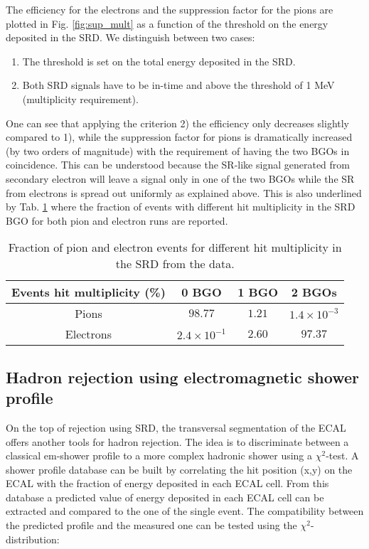 The efficiency for the electrons and the suppression factor for the pions are plotted in Fig. \ref{fig:sup_mult} as a function of the threshold on the energy deposited in the SRD. We distinguish between two cases:
\begin{enumerate}
\item The threshold is set on the total energy deposited in the SRD.
\item Both SRD signals have to be in-time and above the threshold of 1 MeV (multiplicity requirement).
\end{enumerate}
One can see that applying the criterion 2) the efficiency only decreases slightly compared to 1), while the suppression factor for pions is dramatically increased (by two orders of magnitude) with the requirement of having the two BGOs in coincidence.
This can be understood because the SR-like signal generated from secondary electron will leave a signal only in one of the two BGOs while the SR from electrons is spread out uniformly as explained above. 
This is also underlined by Tab. \ref{tab:hits} where the fraction of events with different hit multiplicity in the SRD BGO for both pion and electron runs are reported.

\begin{table}[hbt!]
\begin{center}
\begin{tabular}{cccc}
Events hit multiplicity  (\%) & 0 BGO  & 1 BGO & 2 BGOs\\
\hline
Pions & $98.77$ & $1.21$ & $1.4\times10^{-3}$  \\
Electrons & $2.4\times10^{-1}$  & $2.60$ & $97.37$ \\
\end{tabular}
\end{center}
\caption[Fraction of pion and electron events for different hit multiplicity in the SRD from the data]{Fraction of pion and electron events for different hit multiplicity in the SRD from the data.}
\label{tab:hits}

\end{table}

\subsection{Hadron rejection using electromagnetic shower profile}
\label{ch3:sec:bkg-ecal-profile}

On the top of rejection using SRD, the transversal segmentation of the ECAL offers another tools for hadron rejection. The idea is to discriminate between a classical em-shower profile to a more complex hadronic shower using a $\chi^2$-test. A shower profile database can be built by correlating the hit position (x,y) on the ECAL with the fraction of energy deposited in each ECAL cell. From this database a predicted value of energy deposited in each ECAL cell can be extracted and compared to the one of the single event. The compatibility between the predicted profile and the measured one can be tested using the $\chi^2$-distribution:

